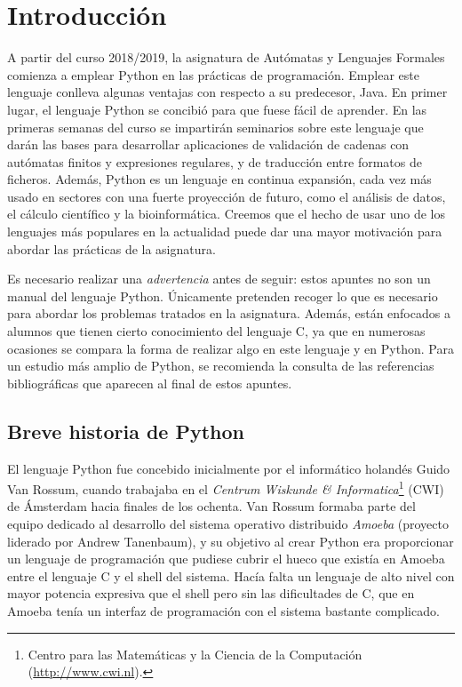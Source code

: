 
\chapter{Introducción}

\lettrine[lines=5]{A}{} partir del curso 2018/2019, la asignatura de Autómatas y Lenguajes Formales comienza a emplear Python en las prácticas de programación. Emplear este lenguaje conlleva algunas ventajas con respecto a su predecesor, Java. En primer lugar, el lenguaje Python se concibió para que fuese fácil de aprender. En las primeras semanas del curso se impartirán seminarios sobre este lenguaje que darán las bases para desarrollar aplicaciones de validación de cadenas con autómatas finitos y expresiones regulares, y de traducción entre formatos de ficheros. Además, Python es un lenguaje en continua expansión, cada vez más usado en sectores con una fuerte proyección de futuro, como el análisis de datos, el cálculo científico y la bioinformática. Creemos que el hecho de usar uno de los lenguajes más populares en la actualidad puede dar una mayor motivación para abordar las prácticas de la asignatura.

Es necesario realizar una \emph{advertencia} antes de seguir: estos apuntes no son un manual del lenguaje Python. Únicamente pretenden recoger lo que es necesario para abordar los problemas tratados en la asignatura. Además, están enfocados a alumnos que tienen cierto conocimiento del lenguaje C, ya que en numerosas ocasiones se compara la forma de realizar algo en este lenguaje y en Python. Para un estudio más amplio de Python, se recomienda la consulta de las referencias bibliográficas que aparecen al final de estos apuntes.

\section{Breve historia de Python}

El lenguaje Python fue concebido inicialmente por el informático holandés Guido Van Rossum, cuando trabajaba en el \emph{Centrum Wiskunde \& Informatica}\footnote{Centro para las Matemáticas y la Ciencia de la Computación (\url{http://www.cwi.nl}).} (CWI) de Ámsterdam hacia finales de los ochenta. Van Rossum formaba parte del equipo dedicado al desarrollo del sistema operativo distribuido \emph{Amoeba} (proyecto liderado por Andrew Tanenbaum), y su objetivo al crear Python era proporcionar un lenguaje de programación que pudiese cubrir el hueco que existía en Amoeba entre el lenguaje C y el shell del sistema. Hacía falta un lenguaje de alto nivel con mayor potencia expresiva que el shell pero sin las dificultades de C, que en Amoeba tenía un interfaz de programación con el sistema bastante complicado. 


